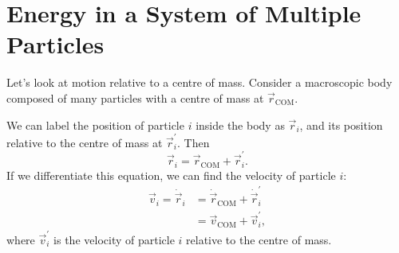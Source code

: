 \documentclass[../classical_mechanics.tex]{subfiles}
\begin{document}
    \section{Energy in a System of Multiple Particles}\label{sec:energy-in-a-system-of-multiple-particles}
        Let's look at motion relative to a centre of mass.
        Consider a macroscopic body composed of many particles with a centre of mass at $\vec{r}_\text{COM}$.
        \begin{figure}[H]
            \centering
        \end{figure}
        We can label the position of particle $i$ inside the body as $\vec{r}_i$, and its position relative to the centre of mass at $\vec{r}_i^\prime$.
        Then
        \begin{equation}
            \vec{r}_i=\vec{r}_\text{COM}+\vec{r}_i^\prime.
        \end{equation}
        If we differentiate this equation, we can find the velocity of particle $i$:
        \begin{align}
            \vec{v}_i=\dot{\vec{r}}_i&=\dot{\vec{r}}_\text{COM}+\dot{\vec{r}}_i^\prime\\
            &=\vec{v}_\text{COM}+\vec{v}_i^\prime,
        \end{align}
        where $\vec{v}_i^\prime$ is the velocity of particle $i$ relative to the centre of mass.
\end{document}
